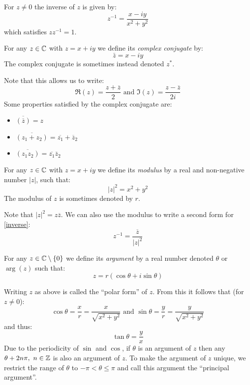 \documentclass[../main.tex]{subfiles}
\begin{document}
For $z \neq 0$ the inverse of $z$ is given by:
\begin{equation}
  z^{-1} = \frac{x - iy}{x^2 + y^2}
  \label{inverse}
\end{equation}
which satisfies $zz^{-1} = 1$.
\begin{definition}
  For any $z \in \mathbb{C}$ with $z = x + iy$ we define its \textit{complex conjugate} by:
  \[
    \bar{z} = x - iy
  \]
  The complex conjugate is sometimes instead denoted $z^{*}$.
\end{definition}
Note that this allows us to write:
\[
  \Re(z) = \frac{z + \overline{z}}{2} \text{ and }
  \Im(z) = \frac{z - \overline{z}}{2i}
\]
Some properties satisfied by the complex conjugate are: \label{complexConjProperties}
\begin{itemize}
  \item $\overline{(\overline{z})} = z$
  \item $\overline{(z_1 + z_2)} = \overline{z_1} + \overline{z}_{2}$
  \item $\overline{(z_1 z_2)} = \overline{z_1} \overline{z}_2$
\end{itemize}
\begin{definition}
  For any $z \in \mathbb{C}$ with $z = x + iy$ we define its \textit{modulus} by a real and non-negative number $|z|$, such that:
  \[
    |z|^2 = x^2 + y^2
  \]
  The modulus of $z$ is sometimes denoted by $r$.
\end{definition}
Note that $|z|^2 = z \overline{z}$.
We can also use the modulus to write a second form for \cref{inverse}:
\[
  z^{-1} = \frac{\overline{z}}{|z|^2}
\]
\begin{definition}
  For any $z \in \mathbb{C} \setminus \{0\}$ we define its \textit{argument} by a real number denoted $\theta$ or $\arg(z)$ such that:
  \[
    z = r(\cos \theta + i \sin \theta)
  \]
\end{definition}
Writing $z$ as above is called the ``polar form'' of $z$.
From this it follows that (for $z \neq 0$):
\[
  \cos \theta = \frac{x}{r} = \frac{x}{\sqrt{x^2 + y^2}}\text{ and }\sin \theta = \frac{y}{r} = \frac{y}{\sqrt{x^2 + y^2}}
\]
and thus:
\[
  \tan \theta = \frac{y}{x}
\]
Due to the periodicity of $\sin$ and $\cos$, if $\theta$ is an argument of $z$ then any $\theta + 2n\pi,\ n \in \mathbb{Z}$ is also an argument of $z$.
To make the argument of $z$ unique, we restrict the range of $\theta$ to $-\pi < \theta \leq \pi$ and call this argument the ``principal argument''.
\end{document}
